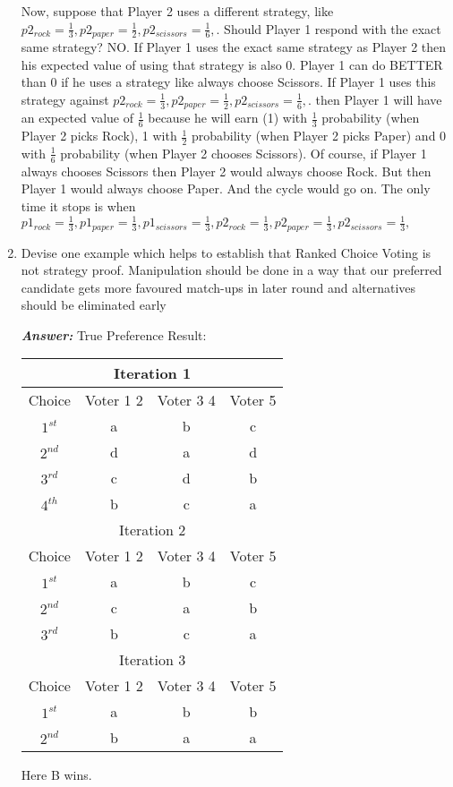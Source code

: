 \documentclass[15pt]{article}
\begin{document}
\begin{enumerate}
Now, suppose that Player 2 uses a different strategy, like $p2_{rock}=\frac{1}{3}, p2_{paper}=\frac{1}{2}, p2_{scissors}=\frac{1}{6},$.
Should Player 1 respond with the exact same strategy? NO. If Player 1 uses the exact same strategy as
Player 2 then his expected value of using that strategy is also 0. Player 1 can do BETTER than 0 if he uses
a strategy like always choose Scissors. If Player 1 uses this strategy against $p2_{rock}=\frac{1}{3}, p2_{paper}=\frac{1}{2}, p2_{scissors}=\frac{1}{6},$.
then Player 1 will have an expected value of $\frac{1}{6}$
because he will earn (1) with $\frac{1}{3}$ probability
(when Player 2 picks Rock), 1 with $\frac{1}{2}$ probability (when Player 2 picks Paper) and 0 with $\frac{1}{6}$ probability
(when Player 2 chooses Scissors). Of course, if Player 1 always chooses Scissors then Player 2 would always choose Rock. But then Player 1 would always choose Paper. And the cycle would go on. The only time it stops is when $p1_{rock}=\frac{1}{3}, p1_{paper}=\frac{1}{3}, p1_{scissors}=\frac{1}{3}, p2_{rock}=\frac{1}{3}, p2_{paper}=\frac{1}{3}, p2_{scissors}=\frac{1}{3},$

\item Devise one example which helps to establish that Ranked Choice Voting is not strategy proof. Manipulation should be done in a way that our preferred candidate gets more favoured match-ups in later round and alternatives should be eliminated early

\textbf{\emph{Answer: }}True Preference Result:
\begin{center}
\begin{tabular}{ |c|c|c|c| } 
 \hline
 \multicolumn{4}{|c|}{Iteration 1} \\ 
 \hline
 Choice & Voter 1 2 & Voter 3 4 & Voter 5  \\ [0.5ex] 
 \hline
 $1^{st}$ & a & b & c \\ 
 \hline
 $2^{nd}$ & d & a & d \\ 
 \hline
 $3^{rd}$ & c & d & b \\ 
 \hline
 $4^{th}$ & b & c & a \\
 \hline
 \multicolumn{4}{|c|}{Iteration 2} \\ 
 \hline
 Choice & Voter 1 2 & Voter 3 4 & Voter 5  \\ [0.5ex] 
 \hline
 $1^{st}$ & a & b & c \\ 
 \hline
 $2^{nd}$ & c & a & b \\ 
 \hline
 $3^{rd}$ & b & c & a \\
 \hline
 \multicolumn{4}{|c|}{Iteration 3} \\ 
 \hline
 Choice & Voter 1 2 & Voter 3 4 & Voter 5  \\ [0.5ex] 
 \hline
 $1^{st}$ & a & b & b \\ 
 \hline
 $2^{nd}$ & b & a & a \\ [1ex] 
 \hline
\end{tabular}
\end{center}
Here B wins.


\end{enumerate}
\end{document}
